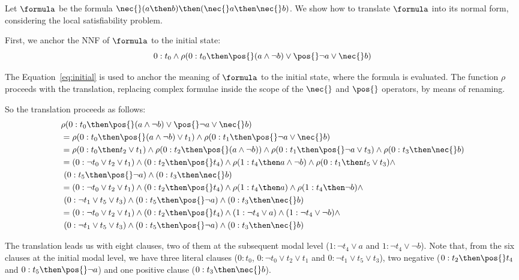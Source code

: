 \begin{example}%
    \label{ex:snf}
    Let $\formula$ be the formula $\nec{}(a \then b) \then (\nec{}a \then \nec{} b)$.
    We show how to translate $\formula$ into its normal form, considering the local
    satisfiability problem.

    First, we anchor the NNF of $\formula$ to the initial state:
    \begin{equation}
        \label{eq:initial}
        0 : t_0 \land \rho(0 : t_0 \then \pos{} (a \land \neg b) \lor \pos{} \neg a \lor \nec{} b)
    \end{equation}

    The Equation~\ref{eq:initial} is used to anchor the meaning of $\formula$ to
    the initial state, where the formula is evaluated. The function $\rho$
    proceeds with the translation, replacing complex formulae inside the
    scope of the $\nec{}$ and $\pos{}$ operators, by means of renaming. 

    So the translation proceeds as follows:
    \begin{align*}
        &\rho(0 : t_0 \then \pos{} (a \land \neg b) \lor \pos{} \neg a \lor \nec{} b) \\
        &= \rho(0: t_0 \then \pos{} (a \land \neg b) \lor t_1) \land \rho(0: t_1 \then \pos{} \neg a \lor \nec{} b) \\
        &= \rho(0: t_0 \then t_2 \lor t_1) \land \rho(0 : t_2 \then \pos {}(a \land \neg b)) \land \rho(0: t_1 \then \pos{} \neg a \lor t_3) \land \rho(0: t_3 \then \nec{} b) \\
        &= (0: \neg t_0 \lor t_2 \lor t_1) \land (0 : t_2 \then \pos {}t_4) \land \rho(1 : t_4 \then a \land \neg b) \land \rho(0: t_1 \then t_5 \lor t_3) \land \\
        &\ (0 : t_5 \then \pos{} \neg a) \land (0: t_3 \then \nec{} b) \\
        &= (0: \neg t_0 \lor t_2 \lor t_1) \land (0 : t_2 \then \pos {}t_4)
        \land \rho(1 : t_4 \then a) \land \rho(1 : t_4 \then \neg b) \land \\ 
        &\ (0: \neg t_1 \lor t_5 \lor t_3) \land (0 : t_5 \then \pos{} \neg a) \land (0: t_3 \then \nec{} b) \\
        &= (0: \neg t_0 \lor t_2 \lor t_1) \land (0 : t_2 \then \pos {}t_4)
        \land (1 : \neg t_4 \lor a) \land (1 : \neg t_4 \lor \neg b) \land \\ 
        &\ (0: \neg t_1 \lor t_5 \lor t_3) \land (0 : t_5 \then \pos{} \neg a) \land (0: t_3 \then \nec{} b) \\
    \end{align*}

    The translation leads us with eight clauses, two of them at the subsequent
    modal level ($1 : \neg t_4 \lor a$ and $1 : \neg t_4 \lor \neg b$). Note
    that, from the six clauses at the initial modal level, we have three literal
    clauses ($0: t_0$, $0: \neg t_0 \lor t_2 \lor t_1$ and $0: \neg t_1 \lor t_5 \lor
    t_3$), two negative ($0 : t_2 \then \pos {}t_4$ and $0 : t_5 \then \pos{}
    \neg a$) and one positive clause ($0: t_3 \then \nec{} b$).
\end{example}

